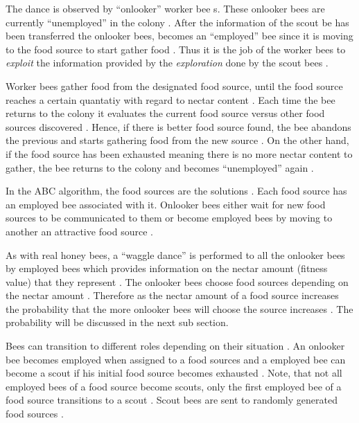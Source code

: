 The dance is observed by ``onlooker'' worker bee \cite{ABCCompareStudy,ABCImageEnhancement}s. These onlooker bees are currently ``unemployed'' in the colony \cite{ABCCompareStudy,ABCImageEnhancement}. After the information of the scout be has been transferred the onlooker bees, becomes an ``employed'' bee since it is moving to the food source to start gather food \cite{ABCCompareStudy,ABCImageEnhancement}. Thus it is the job of the worker bees to \emph{exploit} the information provided by the \emph{exploration} done by the scout bees \cite{ABCCompareStudy,ABCNumericalOptimization}. 

Worker bees gather food from the designated food source, until the food source reaches a certain quantatiy with regard to nectar content \cite{ABCCompareStudy,ABCNumericalOptimization}. Each time the bee returns to the colony it evaluates the current food source versus other food sources discovered \cite{ABCCompareStudy,ABCNumericalOptimization}. Hence, if there is better food source found, the bee abandons the previous and starts gathering food from the new source \cite{ABCCompareStudy,ABCNumericalOptimization}. On the other hand, if the food source has been exhausted meaning there is no more nectar content to gather, the bee returns to the colony and becomes ``unemployed'' again \cite{ABCCompareStudy,ABCNumericalOptimization}.

In the ABC algorithm, the food sources are the solutions \cite{ABCCompareStudy,ABCNumericalOptimization}. Each food source has an employed bee associated with it. Onlooker bees either wait for new food sources to be communicated to them or become employed bees by moving to another an attractive food source \cite{ABCCompareStudy,ABCNumericalOptimization}. 

As with real honey bees, a ``waggle dance'' is performed to all the onlooker bees by employed bees which provides information on the nectar amount (fitness value) that they represent \cite{ABCReconfigDistro,ABCCompareStudy,ABCImageEnhancement}. The onlooker bees choose food sources depending on the nectar amount \cite{ABCReconfigDistro,ABCCompareStudy,ABCImageEnhancement}. Therefore as the nectar amount of a food source increases the probability that the more onlooker bees will choose the source increases \cite{ABCReconfigDistro,ABCCompareStudy,ABCImageEnhancement}. The probability will be discussed in the next sub section.

Bees can transition to different roles depending on their situation \cite{ABCCompareStudy,ABCNumericalOptimization}. An onlooker bee becomes employed when assigned to a food sources and a employed bee can become a scout if his initial food source becomes exhausted \cite{ABCImageEnhancement,ABCCompareStudy,ABCReconfigDistro}. Note, that not all employed bees of a food source become scouts, only the first employed bee of a food source transitions to a scout \cite{ABCImageEnhancement,ABCCompareStudy,ABCReconfigDistro}. Scout bees are sent to randomly generated food sources \cite{ABCImageEnhancement,ABCCompareStudy,ABCReconfigDistro}. 

